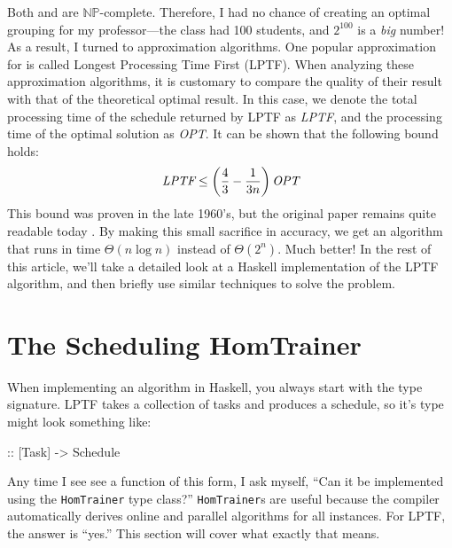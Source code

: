 \documentclass[tikz]{tmr}
\newcommand\h{\lstinline}
\newcommand{\prob}[1]{{\sc {#1}}}
\newcommand{\np}{{\ensuremath{\mathbb{NP}}}}
\newcommand\+{\mdoubleplus}
\begin{document}
Both \prob{Scheduling} and \prob{BinPacking} are \np-complete.
Therefore, I had no chance of creating an optimal grouping for my professor---the class had 100 students, and $2^{100}$ is a \textit{big} number! 
As a result, I turned to approximation algorithms.
One popular approximation for \prob{Scheduling} is called Longest Processing Time First (LPTF).
When analyzing these approximation algorithms, it is customary to compare the quality of their result with that of the theoretical optimal result.
In this case, we denote the total processing time of the schedule returned by LPTF as \textit{LPTF}, and the processing time of the optimal solution as \textit{OPT}.
It can be shown that the following bound holds:
$$
\textit{LPTF} \le \left( {4\over3} - {1\over{3n}} \right) \textit{OPT}
$$
This bound was proven in the late 1960's, but the original paper remains quite readable today \cite{graham69}.
By making this small sacrifice in accuracy, we get an algorithm that runs in time $\Theta(n\log n)$ instead of $\Theta(2^n)$.  Much better!  In the rest of this article, we'll take a detailed look at a Haskell implementation of the LPTF algorithm, and then briefly use similar techniques to solve the \prob{BinPacking} problem.

\section{The Scheduling HomTrainer}

When implementing an algorithm in Haskell, you always start with the type signature.
LPTF takes a collection of tasks and produces a schedule, so it's type might look something like:
\begin{spec}
:: [Task] -> Schedule
\end{spec}
Any time I see see a function of this form, I ask myself, ``Can it be implemented using the \h{HomTrainer} type class?'' 
\h{HomTrainer}s are useful because the compiler automatically derives online and parallel algorithms for all instances.
For LPTF, the answer is ``yes.''
This section will cover what exactly that means.
\end{document}
